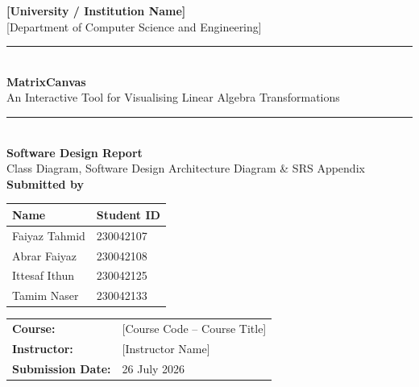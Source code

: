 \documentclass[11pt,a4paper]{article}
\begin{document}
\begin{titlepage}
\centering
\vspace*{1.2cm}

{\Large \bfseries [University / Institution Name]}\\[0.3cm]
{\large [Department of Computer Science and Engineering]}\\[1.8cm]

\rule{0.85\textwidth}{0.6pt}\\[0.5cm]
{\huge \bfseries MatrixCanvas}\\[0.35cm]
{\Large An Interactive Tool for Visualising Linear Algebra Transformations}\\[0.5cm]
\rule{0.85\textwidth}{0.6pt}\\[1.2cm]

{\Large \bfseries Software Design Report}\\[0.2cm]
{\normalsize Class Diagram, Software Design Architecture Diagram \& SRS Appendix}\\[1.6cm]

{\large \bfseries Submitted by}\\[0.5cm]
\begin{tabular}{ll}
\toprule
\textbf{Name} & \textbf{Student ID} \\
\midrule
Faiyaz Tahmid  & 230042107 \\
Abrar Faiyaz   & 230042108 \\
Ittesaf Ithun  & 230042125 \\
Tamim Naser    & 230042133 \\
\bottomrule
\end{tabular}

\vfill

\begin{tabular}{ll}
\textbf{Course:}      & [Course Code -- Course Title] \\
\textbf{Instructor:}  & [Instructor Name] \\
\textbf{Submission Date:} & 26 July 2026 \\
\end{tabular}

\vspace{0.6cm}
\end{titlepage}

\tableofcontents
\newpage

\end{document}
